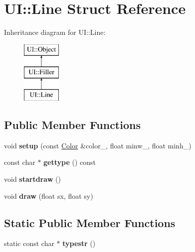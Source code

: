 \hypertarget{struct_u_i_1_1_line}{}\section{UI\+:\+:Line Struct Reference}
\label{struct_u_i_1_1_line}
Inheritance diagram for UI\+:\+:Line\+:\begin{figure}[H]
\begin{center}
\leavevmode
\includegraphics[height=3.000000cm]{struct_u_i_1_1_line}
\end{center}
\end{figure}
\subsection*{Public Member Functions}
\begin{DoxyCompactItemize}
\item 
\mbox{\label{struct_u_i_1_1_line_a933c67fa43b5e1e67111a39281b0890c}} 
void {\bfseries setup} (const \hyperlink{struct_u_i_1_1_color}{Color} \&color\+\_\+, float minw\+\_, float minh\+\_)
\item 
\mbox{\label{struct_u_i_1_1_line_ac3ce599c72f94dca7ddc4c1fed4d998b}} 
const char $\ast$ {\bfseries gettype} () const
\item 
\mbox{\label{struct_u_i_1_1_line_a7dbd94feaca504a79dc328966f0caab4}} 
void {\bfseries startdraw} ()
\item 
\mbox{\label{struct_u_i_1_1_line_a7a42d4fff9b9e3cbed5bd67428b8856c}} 
void {\bfseries draw} (float sx, float sy)
\end{DoxyCompactItemize}
\subsection*{Static Public Member Functions}
\begin{DoxyCompactItemize}
\item 
\mbox{\label{struct_u_i_1_1_line_a4d2802ed973dab0d3a14044e6de8ef9a}} 
static const char $\ast$ {\bfseries typestr} ()
\end{DoxyCompactItemize}
